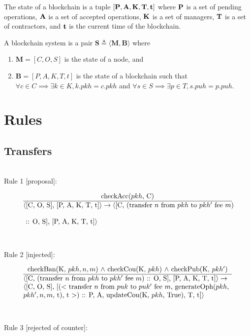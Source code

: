 \documentclass[a4paper]{llncs}
\begin{document}
\begin{definition}[Blockchain]
  The state of a blockchain is a tuple
  $[\textbf{P}, \textbf{A}, \textbf{K}, \textbf{T}, \textbf{t}]$ where
  $\textbf{P}$ is a set of pending operations,  $\textbf{A}$ is a set
  of accepted operations, $\textbf{K}$ is a set of managers,
  $\textbf{T}$ is a set of contractors, and $\textbf{t}$ is the current time of the blockchain. 
\end{definition}

\begin{definition}
A blockchain system is a pair
$\mathbf{S} \triangleq\langle \mathbf{M}, \mathbf{B} \rangle$ where
\begin{enumerate}
\item $\mathbf{M} = [C, O, S]$ is the state of a node, and
\item $\mathbf{B} = [P, A, K, T, t]$ is the state of a blockchain 
  such that $\forall c \in C \implies \exists k\in K, k.pkh = c.pkh$
  and $\forall s \in S \implies \exists p \in T, s.puh = p.puh$.
\end{enumerate}
\end{definition}

\section{Rules}
\subsection{Transfers}
~\\
Rule 1 [proposal]:

\begin{equation}{}
\frac{\text{checkAcc($pkh$, C)}}{\parbox{4.2in}{\text{$\langle$[C, O, S], [P, A, K, T, t]$\rangle \rightarrow \langle$[C, (transfer $n$ from $pkh$ to $pkh'$ fee $m$)} ~\\\text{ :: O, S], [P, A, K, T, t]$\rangle$}}} 
\end{equation}
~\\
~\\
Rule 2 [injected]:

\begin{equation}{}
\frac{\text{checkBan(K, $pkh, n, m$) $\wedge$ checkCou(K, $pkh$) $\wedge$ checkPub(K, $pkh'$)}}{\parbox{4.2in}{\text{$\langle$[C, (transfer $n$ from $pkh$ to $pkh'$ fee $m$) :: O, S], [P, A, K, T, t]$\rangle \rightarrow$}\\
\text{$\langle$[C, O, S], [($<$ transfer $n$ from $puk$ to $puk'$ fee $m$, generateOph($pkh$, }\\
\text{$pkh', n, m$, t), t $>$) :: P, A, updateCou(K, $pkh$, True), T, t]$\rangle$}}} 
\end{equation}
~\\
~\\
Rule 3 [rejected of counter]:
\end{document}

